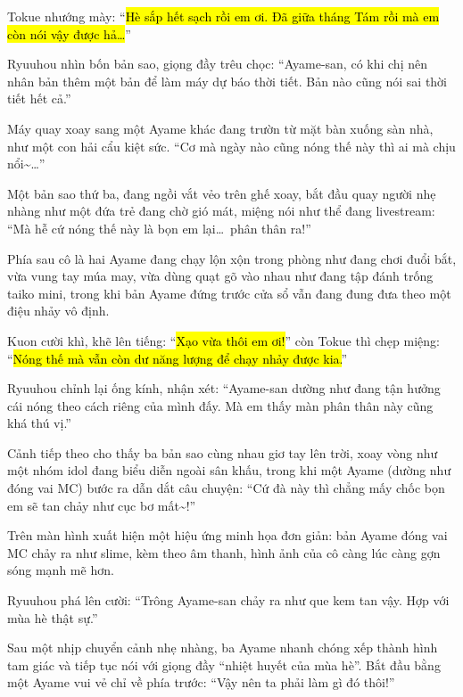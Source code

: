 \documentclass[../main.tex]{subfiles}
\begin{document}
Tokue nhướng mày: ``\hl{Hè sắp hết sạch rồi em ơi. Đã giữa tháng Tám rồi mà em còn nói vậy được hả\dots}''

Ryuuhou nhìn bốn bản sao, giọng đầy trêu chọc: ``Ayame-san, có khi chị nên nhân bản thêm một bản để làm máy dự báo thời tiết. Bản nào cũng nói sai thời tiết hết cả.''


Máy quay xoay sang một Ayame khác đang trườn từ mặt bàn xuống sàn nhà, như một con hải cẩu kiệt sức. ``Cơ mà ngày nào cũng nóng thế này thì ai mà chịu nổi\~{}\dots''


Một bản sao thứ ba, đang ngồi vắt vẻo trên ghế xoay, bắt đầu quay người nhẹ nhàng như một đứa trẻ đang chờ gió mát, miệng nói như thể đang livestream: ``Mà hễ cứ nóng thế này là bọn em lại\dots\ phân thân ra!''

Phía sau cô là hai Ayame đang chạy lộn xộn trong phòng như đang chơi đuổi bắt, vừa vung tay múa may, vừa dùng quạt gõ vào nhau như đang tập đánh trống taiko mini, trong khi bản Ayame đứng trước cửa sổ vẫn đang đung đưa theo một điệu nhảy vô định.


Kuon cười khì, khẽ lên tiếng: ``\hl{Xạo vừa thôi em ơi!}'' còn Tokue thì chẹp miệng: ``\hl{Nóng thế mà vẫn còn dư năng lượng để chạy nhảy được kia.}''

Ryuuhou chỉnh lại ống kính, nhận xét: ``Ayame-san dường như đang tận hưởng cái nóng theo cách riêng của mình đấy. Mà em thấy màn phân thân này cũng khá thú vị.''

Cảnh tiếp theo cho thấy ba bản sao cùng nhau giơ tay lên trời, xoay vòng như một nhóm idol đang biểu diễn ngoài sân khấu, trong khi một Ayame (dường như đóng vai MC) bước ra dẫn dắt câu chuyện: ``Cứ đà này thì chẳng mấy chốc bọn em sẽ tan chảy như cục bơ mất\~{}!''


Trên màn hình xuất hiện một hiệu ứng minh họa đơn giản: bản Ayame đóng vai MC chảy ra như slime, kèm theo âm thanh, hình ảnh của cô càng lúc càng gợn sóng mạnh mẽ hơn.

Ryuuhou phá lên cười: ``Trông Ayame-san chảy ra như que kem tan vậy. Hợp với mùa hè thật sự.''

Sau một nhịp chuyển cảnh nhẹ nhàng, ba Ayame nhanh chóng xếp thành hình tam giác và tiếp tục nói với giọng đầy ``nhiệt huyết của mùa hè''. Bắt đầu bằng một Ayame vui vẻ chỉ về phía trước: ``Vậy nên ta phải làm gì đó thôi!''
\end{document}
